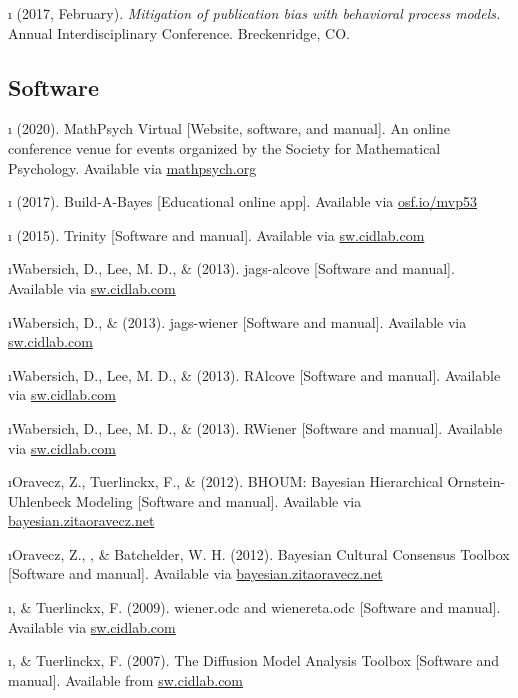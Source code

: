 \documentclass[]{article}
\begin{document}
\i \vdkh{} (2017, February).
\newblock \textit{Mitigation of publication bias with behavioral process models.}
\newblock Annual Interdisciplinary Conference. Breckenridge, CO.

\erefs


   
   

\subsection*{Software}
\srefs
\i \vdkh{} (2020).
\newblock MathPsych Virtual [Website, software, and manual]. An online conference venue for events organized by the Society for Mathematical Psychology.
\newblock Available via \url{mathpsych.org}
  
\i \vdkh{} (2017).
\newblock Build-A-Bayes [Educational online app].
\newblock Available via \url{osf.io/mvp53}

\i \vdkh{} (2015).
\newblock Trinity [Software and manual].
\newblock Available via \url{sw.cidlab.com}

\i Wabersich, D., Lee, M. D., \& \vdkh{} (2013).
\newblock jags-alcove [Software and manual].
\newblock Available via \url{sw.cidlab.com}

\i Wabersich, D., \& \vdkh{} (2013).
\newblock jags-wiener [Software and manual].
\newblock Available via \url{sw.cidlab.com}

\i Wabersich, D., Lee, M. D., \& \vdkh{} (2013).
\newblock RAlcove [Software and manual].
\newblock Available via \url{sw.cidlab.com}

\i Wabersich, D., Lee, M. D., \& \vdkh{} (2013).
\newblock RWiener [Software and manual].
\newblock Available via \url{sw.cidlab.com}

\i Oravecz, Z., Tuerlinckx, F., \& \vdkh{} (2012). 
\newblock BHOUM: Bayesian Hierarchical Ornstein-Uhlenbeck Modeling [Software and manual]. 
\newblock Available via \url{bayesian.zitaoravecz.net}

\i Oravecz, Z., \vdkh{}, \& Batchelder, W. H. (2012).
\newblock Bayesian Cultural Consensus Toolbox [Software and manual]. 
\newblock Available via \url{bayesian.zitaoravecz.net}

\i \vdkh{}, \& Tuerlinckx, F. (2009). 
\newblock wiener.odc and wienereta.odc [Software and manual]. 
\newblock Available via \url{sw.cidlab.com}

\i \vdkh{}, \& Tuerlinckx, F. (2007). 
\newblock The Diffusion Model Analysis Toolbox [Software and manual].
\newblock Available from \url{sw.cidlab.com}
\end{document}

